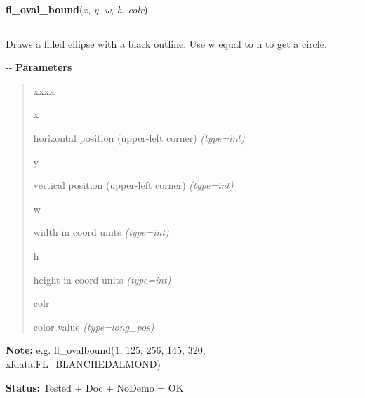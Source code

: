     \vspace{0.5ex}

\hspace{.8\funcindent}\begin{boxedminipage}{\funcwidth}

    \raggedright \textbf{fl\_oval\_bound}(\textit{x}, \textit{y}, \textit{w}, \textit{h}, \textit{colr})

    \vspace{-1.5ex}

    \rule{\textwidth}{0.5\fboxrule}
\setlength{\parskip}{2ex}

Draws a filled ellipse with a black outline. Use w equal to h to get a
circle.

-{}-
\setlength{\parskip}{1ex}
      \textbf{Parameters}
      \vspace{-1ex}

      \begin{quote}
        \begin{Ventry}{xxxx}

          \item[x]


horizontal position (upper-left corner)
            {\it (type=int)}

          \item[y]


vertical position (upper-left corner)
            {\it (type=int)}

          \item[w]


width in coord units
            {\it (type=int)}

          \item[h]


height in coord units
            {\it (type=int)}

          \item[colr]


color value
            {\it (type=long\_pos)}

        \end{Ventry}

      \end{quote}

\textbf{Note:} 
e.g. fl\_ovalbound(1, 125, 256, 145, 320, xfdata.FL\_BLANCHEDALMOND)


\textbf{Status:} 
Tested + Doc + NoDemo = OK


    \end{boxedminipage}

    \label{xformslib:flxbasic:fl_circf}

